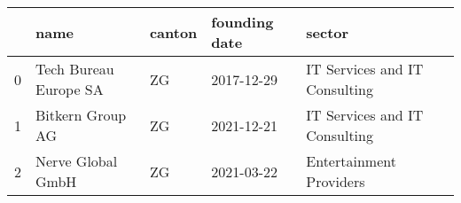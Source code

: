 \begin{tabular}{lllll}
\toprule
{} &                   name & canton & founding date &                         sector \\
\midrule
0 &  Tech Bureau Europe SA &     ZG &    2017-12-29 &  IT Services and IT Consulting \\
1 &       Bitkern Group AG &     ZG &    2021-12-21 &  IT Services and IT Consulting \\
2 &      Nerve Global GmbH &     ZG &    2021-03-22 &        Entertainment Providers \\
\bottomrule
\end{tabular}
